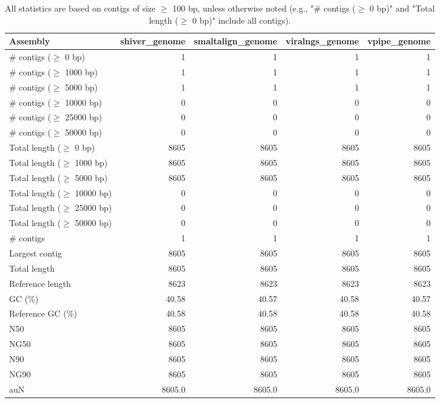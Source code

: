 \documentclass[12pt,a4paper]{article}
\begin{document}
\begin{table}[ht]
\begin{center}
\caption{All statistics are based on contigs of size $\geq$ 100 bp, unless otherwise noted (e.g., "\# contigs ($\geq$ 0 bp)" and "Total length ($\geq$ 0 bp)" include all contigs).}
\begin{tabular}{|l*{4}{|r}|}
\hline
Assembly & shiver\_genome & smaltalign\_genome & viralngs\_genome & vpipe\_genome \\ \hline
\# contigs ($\geq$ 0 bp) & 1 & 1 & 1 & 1 \\ \hline
\# contigs ($\geq$ 1000 bp) & 1 & 1 & 1 & 1 \\ \hline
\# contigs ($\geq$ 5000 bp) & 1 & 1 & 1 & 1 \\ \hline
\# contigs ($\geq$ 10000 bp) & 0 & 0 & 0 & 0 \\ \hline
\# contigs ($\geq$ 25000 bp) & 0 & 0 & 0 & 0 \\ \hline
\# contigs ($\geq$ 50000 bp) & 0 & 0 & 0 & 0 \\ \hline
Total length ($\geq$ 0 bp) & 8605 & 8605 & 8605 & 8605 \\ \hline
Total length ($\geq$ 1000 bp) & 8605 & 8605 & 8605 & 8605 \\ \hline
Total length ($\geq$ 5000 bp) & 8605 & 8605 & 8605 & 8605 \\ \hline
Total length ($\geq$ 10000 bp) & 0 & 0 & 0 & 0 \\ \hline
Total length ($\geq$ 25000 bp) & 0 & 0 & 0 & 0 \\ \hline
Total length ($\geq$ 50000 bp) & 0 & 0 & 0 & 0 \\ \hline
\# contigs & 1 & 1 & 1 & 1 \\ \hline
Largest contig & 8605 & 8605 & 8605 & 8605 \\ \hline
Total length & 8605 & 8605 & 8605 & 8605 \\ \hline
Reference length & 8623 & 8623 & 8623 & 8623 \\ \hline
GC (\%) & 40.58 & 40.57 & 40.58 & 40.57 \\ \hline
Reference GC (\%) & 40.58 & 40.58 & 40.58 & 40.58 \\ \hline
N50 & 8605 & 8605 & 8605 & 8605 \\ \hline
NG50 & 8605 & 8605 & 8605 & 8605 \\ \hline
N90 & 8605 & 8605 & 8605 & 8605 \\ \hline
NG90 & 8605 & 8605 & 8605 & 8605 \\ \hline
auN & 8605.0 & 8605.0 & 8605.0 & 8605.0 \\ \hline

\end{tabular}
\end{center}
\end{table}
\end{document}
